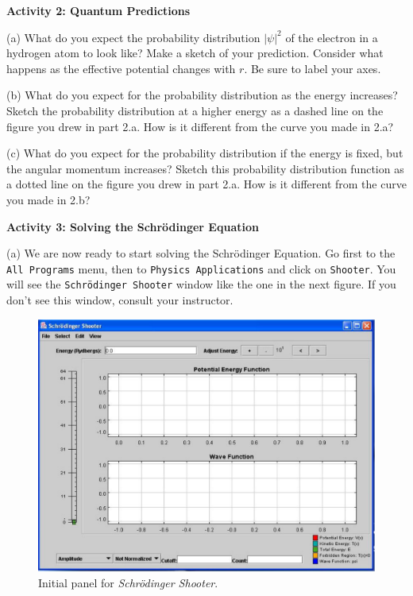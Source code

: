 \textbf{Activity 2: Quantum Predictions}

(a) What do you expect the probability distribution $|\psi|^2$ 
of the electron in a hydrogen atom to look like?
Make a sketch of your prediction.
Consider what happens
as the effective potential changes with $r$.
Be sure to label your axes.
\vskip 4.0cm

\newpage

(b) What do you expect for the probability distribution as the energy increases?
Sketch the probability distribution at a higher energy as
a dashed line on the figure you drew in part 2.a.
How is it different from the curve you made in 2.a?
\vskip 4.0cm

(c) What do you expect for the  probability distribution if the energy is fixed, but the
angular momentum increases?
Sketch this probability distribution function as
a dotted line on the figure you drew in part 2.a.
How is it different from the curve you made in 2.b?
\vskip 4.0cm

\textbf{Activity 3: Solving the Schr\"odinger Equation}

(a) We are now ready to start solving the Schr\"odinger Equation.
Go first to the {\tt All Programs} menu, then
to {\tt Physics Applications} and click on {\tt Shooter}.
You will see the {\tt Schr\"odinger Shooter} window like the one in the next figure.
If you don't see this window, consult your instructor.
\begin{figure}[hbt]
\begin{center}
\includegraphics[width=5.0in]{qmProbability/shooter1b.pdf}
\caption{Initial panel for {\it Schr\"odinger Shooter}.}
\end{center}
\end{figure}

